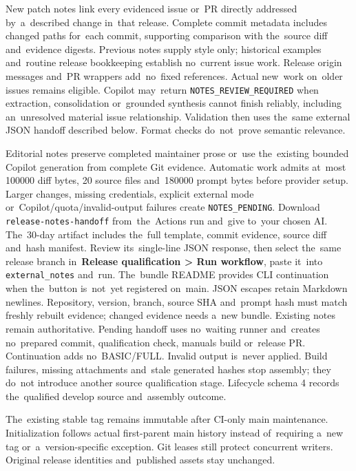\documentclass[11pt,a4paper]{article}
\newcommand{\filepath}[1]{\path{#1}}
\newcommand{\ui}[1]{\textbf{#1}}
\newcommand{\codeword}[1]{\nolinkurl{#1}}
\begin{document}
New patch notes link every evidenced issue or~PR directly addressed
by~a~described
change in~that release. Complete commit metadata includes changed paths
for~each commit, supporting comparison with the~source diff and~evidence
digests.
Previous notes supply style only; historical examples and~routine release
bookkeeping establish no~current issue work. Release origin messages and~PR
wrappers add~no~fixed references. Actual new~work on~older issues remains
eligible.
Copilot may~return \codeword{NOTES_REVIEW_REQUIRED} when extraction,
consolidation or~grounded synthesis cannot finish reliably, including
an~unresolved material issue relationship. Validation then uses the~same
external
JSON handoff described below. Format checks do~not~prove semantic relevance.

Editorial notes preserve completed maintainer prose or~use the~existing
bounded Copilot generation from complete Git evidence. Automatic work admits
at~most 100000 diff bytes, 20 source files and~180000 prompt bytes before
provider setup. Larger changes, missing credentials, explicit external mode
or~Copilot/quota/invalid-output failures create \codeword{NOTES_PENDING}.
Download \codeword{release-notes-handoff} from~the~Actions run and~give
\filepath{prompt.txt} to~your chosen AI. The~30-day artifact includes the~full
template, commit evidence, source diff and~hash manifest. Review its~single-line
JSON response, then select the~same release branch in~\ui{Release qualification
> Run workflow}, paste it~into \codeword{external_notes} and~run.
The~bundle README provides CLI continuation when the~button is~not~yet
registered on~main. JSON escapes retain Markdown newlines. Repository, version,
branch, source SHA and~prompt hash must match freshly rebuilt evidence;
changed evidence needs a~new bundle. Existing notes remain authoritative.
Pending handoff uses no~waiting runner and~creates no~prepared commit,
qualification check, manuals build or~release PR. Continuation adds
no~BASIC/FULL.
Invalid output is~never applied. Build failures, missing attachments
and~stale generated hashes stop
assembly; they do~not introduce another source qualification stage.
Lifecycle schema 4 records the~qualified develop source and~assembly outcome.

The~existing stable tag remains immutable after CI-only main maintenance.
Initialization follows actual first-parent main history instead of~requiring
a~new tag or~a~version-specific exception. Git leases still protect concurrent
writers. Original release identities and~published assets stay unchanged.
\end{document}

